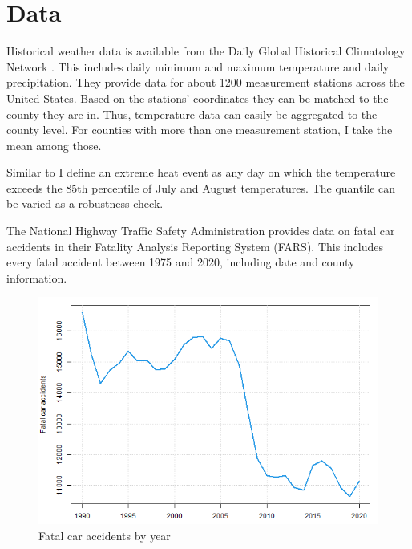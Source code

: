 
\section{Data}

Historical weather data is available from the Daily Global Historical Climatology Network \citep{Menne_2012}. This includes daily minimum and maximum temperature and daily precipitation. They provide data for about 1200 measurement stations across the United States. Based on the stations' coordinates they can be matched to the county they are in. Thus, temperature data can easily be aggregated to the county level. For counties with more than one measurement station, I take the mean among those.

Similar to \citet{Habeeb_2015} I define an extreme heat event as any day on which the temperature exceeds the 85th percentile of July and August temperatures. The quantile can be varied as a robustness check.

The National Highway Traffic Safety Administration provides data on fatal car accidents in their Fatality Analysis Reporting System (FARS). This includes every fatal accident between 1975 and 2020, including date and county information.


\begin{figure}[h]
	\centering
	\includegraphics[scale = 0.5]{"../Code & Data/FatalAccidentsYearly.png"}
	\caption{Fatal car accidents by year}
\end{figure} 

